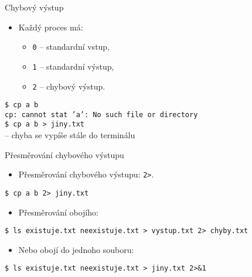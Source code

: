 \documentclass{beamer}
\begin{document}
\begin{frame}[fragile]{Chybový výstup}
	\begin{itemize}
		\item Každý proces má:
		\begin{itemize}
			\item \texttt{0} – standardní vstup,
			\item \texttt{1} – standardní výstup,
			\item \texttt{2} – chybový výstup.
		\end{itemize}
	\end{itemize}
	\vspace{0.4em}
	\hspace{2em}\texttt{\$ cp a b} \\
	\hspace{2em}\texttt{cp: cannot stat 'a': No such file or directory} \\[0.4em]
	\hspace{2em}\texttt{\$ cp a b > jiny.txt} \\
	\hspace{2em}– chyba se vypíše stále do terminálu
\end{frame}

\begin{frame}[fragile]{Přesměrování chybového výstupu}
	\begin{itemize}
		\item Přesměrování chybového výstupu: \texttt{2>}.
	\end{itemize}
	\vspace{0.4em}
	\hspace{2em}\texttt{\$ cp a b 2> jiny.txt} \\[0.4em]
	\begin{itemize}
		\item Přesměrování obojího:
	\end{itemize}
	\hspace{2em}\texttt{\$ ls existuje.txt neexistuje.txt > vystup.txt 2> chyby.txt} \\[0.4em]
	\begin{itemize}
		\item Nebo obojí do jednoho souboru:
	\end{itemize}
	\hspace{2em}\texttt{\$ ls existuje.txt neexistuje.txt > jiny.txt 2>\&1}
\end{frame}
\end{document}
